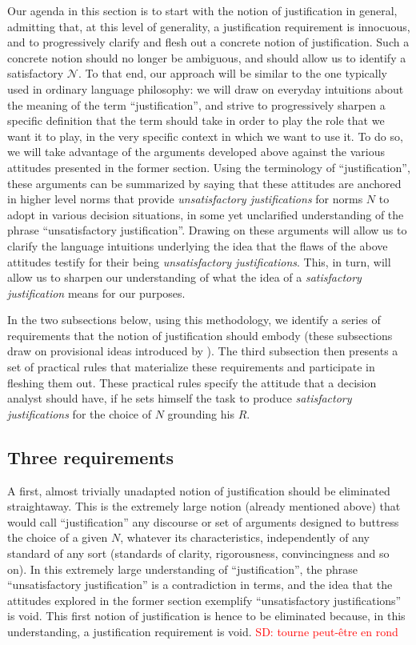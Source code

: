 \documentclass[preprint, french, english, 11pt, authoryear]{elsarticle}%
\newcommand{\commentSD}[1]{\textcolor{red}{SD: #1}}
\newcommand{\adv}{\mathscr{N}}
\begin{document}
Our agenda in this section is to start with the notion of justification in general, admitting that, at this level of generality, a justification requirement is innocuous, and to progressively clarify and flesh out a concrete notion of justification. Such a concrete notion should no longer be ambiguous, and should allow us to identify a satisfactory $\adv$. To that end, our approach will be similar to the one typically used in ordinary language philosophy: we will draw on everyday intuitions about the meaning of the term ``justification'', and strive to progressively sharpen a specific definition that the term should take in order to play the role that we want it to play, in the very specific context in which we want to use it. To do so, we will take advantage of the arguments developed above against the various attitudes presented in the former section. Using the terminology of ``justification'', these arguments can be summarized by saying that these attitudes are anchored in higher level norms that provide \emph{unsatisfactory justifications} for norms $N$ to adopt in various decision situations, in some yet unclarified understanding of the phrase ``unsatisfactory justification''. Drawing on these arguments will allow us to clarify the language intuitions underlying the idea that the flaws of the above attitudes testify for their being \emph{unsatisfactory justifications}. This, in turn, will allow us to sharpen our understanding of what the idea of a \emph{satisfactory justification} means for our purposes.

In the two subsections below, using this methodology, we identify a series of requirements that the notion of justification should embody (these subsections draw on provisional ideas introduced by \citet{meinard_du_2013, meinard_what_2017}). The third subsection then presents a set of practical rules that materialize these requirements and participate in fleshing them out. These practical rules specify the attitude that a decision analyst should have, if he sets himself the task to produce \emph{satisfactory justifications} for the choice of $N$ grounding his $R$.

\subsection{Three requirements}
A first, almost trivially unadapted notion of justification should be eliminated straightaway. This is the extremely large notion (already mentioned above) that would call ``justification'' any discourse or set of arguments designed to buttress the choice of a given $N$, whatever its characteristics, independently of any standard of any sort (standards of clarity, rigorousness, convincingness and so on). In this extremely large understanding of ``justification'', the phrase ``unsatisfactory justification'' is a contradiction in terms, and the idea that the attitudes explored in the former section exemplify ``unsatisfactory justifications'' is void. This first notion of justification is hence to be eliminated because, in this understanding, a justification requirement is void. \commentSD{tourne peut-être en rond}
\end{document}
